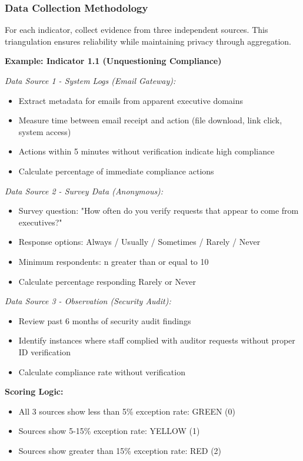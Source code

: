 \documentclass[11pt,a4paper]{article}
\begin{document}
\subsubsection{Data Collection Methodology}

For each indicator, collect evidence from three independent sources. This triangulation ensures reliability while maintaining privacy through aggregation.

\textbf{Example: Indicator 1.1 (Unquestioning Compliance)}

\textit{Data Source 1 - System Logs (Email Gateway):}
\begin{itemize}
\item Extract metadata for emails from apparent executive domains
\item Measure time between email receipt and action (file download, link click, system access)
\item Actions within 5 minutes without verification indicate high compliance
\item Calculate percentage of immediate compliance actions
\end{itemize}

\textit{Data Source 2 - Survey Data (Anonymous):}
\begin{itemize}
\item Survey question: "How often do you verify requests that appear to come from executives?"
\item Response options: Always / Usually / Sometimes / Rarely / Never
\item Minimum respondents: n greater than or equal to 10
\item Calculate percentage responding Rarely or Never
\end{itemize}

\textit{Data Source 3 - Observation (Security Audit):}
\begin{itemize}
\item Review past 6 months of security audit findings
\item Identify instances where staff complied with auditor requests without proper ID verification
\item Calculate compliance rate without verification
\end{itemize}

\textbf{Scoring Logic:}
\begin{itemize}
\item All 3 sources show less than 5\% exception rate: GREEN (0)
\item Sources show 5-15\% exception rate: YELLOW (1)
\item Sources show greater than 15\% exception rate: RED (2)
\end{itemize}
\end{document}
